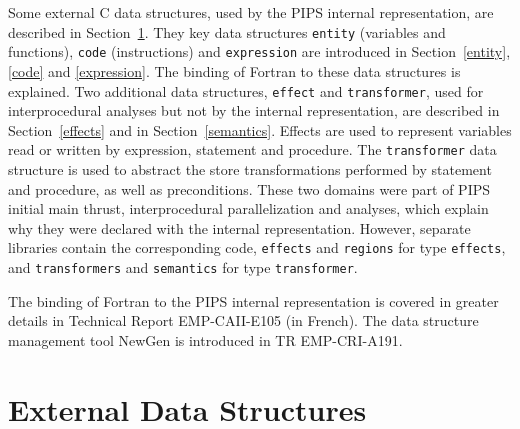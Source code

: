 \documentclass[a4paper]{article}
\begin{document}
Some external C data structures, used by the PIPS internal
representation, are described in Section~\ref{external}. They key data
structures \texttt{entity} (variables and functions), \texttt{code}
(instructions) and \verb+expression+ are introduced in
Section~\ref{entity}, \ref{code} and \ref{expression}. The binding of
Fortran to these data structures is explained. Two additional data
structures, \verb+effect+ and \verb+transformer+, used for
interprocedural analyses but not by the internal representation, are
described in Section~\ref{effects} and in
Section~\ref{semantics}. Effects are used to represent variables read or
written by expression, statement and procedure. The \verb+transformer+
data structure is used to abstract the store transformations performed
by statement and procedure, as well as preconditions. These two domains
were part of PIPS initial main thrust, interprocedural parallelization
and analyses, which explain why they were declared with the internal
representation. However, separate libraries contain the corresponding
code, \texttt{effects} and \texttt{regions} for type \texttt{effects}, and
\texttt{transformers} and \texttt{semantics} for type \texttt{transformer}.

\begin{comment}
Apr�s une description rapide des structures de donn�es externes � la
repr�sentation interne de PIPS, nous pr�sentons successivement les
notions d'entit�s, de code et d'expressions et la mani�re dont elles
sont utilis�es pour encoder un programme Fortran. Nous d�taillons
ensuite deux structures de donn�es suppl�mentaires, les effets et les
\emph{transformers} qui sont utilis�s pour le calcul de d�pendance
interproc�dural et pour l'analyse syntaxique interproc�durale.
\end{comment}

The binding of Fortran to the PIPS internal representation is covered in
greater details in Technical Report EMP-CAII-E105 (in French). The data
structure management tool NewGen is introduced in TR EMP-CRI-A191.

\begin{comment}
La mani�re dont les constructions de Fortran sont repr�sent�es est
d�crite dans une des sections du rapport EMP-CAII-E105. NewGen est
pr�sent� dans le rapport EMP-CRI-A191.
\end{comment}

\section{External Data Structures}
\label{external}
\end{document}
